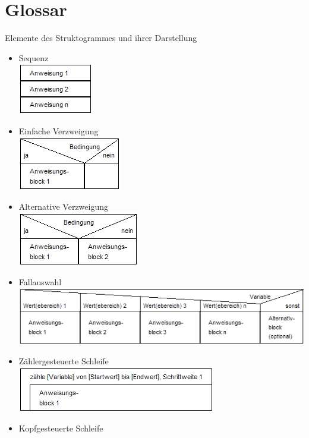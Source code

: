 \documentclass[a4paper,10pt]{report}
\begin{document}
\section{Glossar}
Elemente des Struktogrammes und ihrer Darstellung
\begin{itemize}
	\item Sequenz\\
	
	\includegraphics[scale=1]{LineareAnw.png} 
	\item Einfache Verzweigung\\
	
	\includegraphics[scale=1]{EinfAusw.png} 
	\item Alternative Verzweigung\\
	
	\includegraphics[scale=1]{ZweifAusw.png}
	\item Fallauswahl\\
	
	\includegraphics[scale=1]{Fallauswahl.png} 
	\item Zählergesteuerte Schleife\\
	
	\includegraphics[scale=1]{Zaehlschleife.png} 
	\item Kopfgesteuerte Schleife\\
	

\end{itemize}
\end{document}
